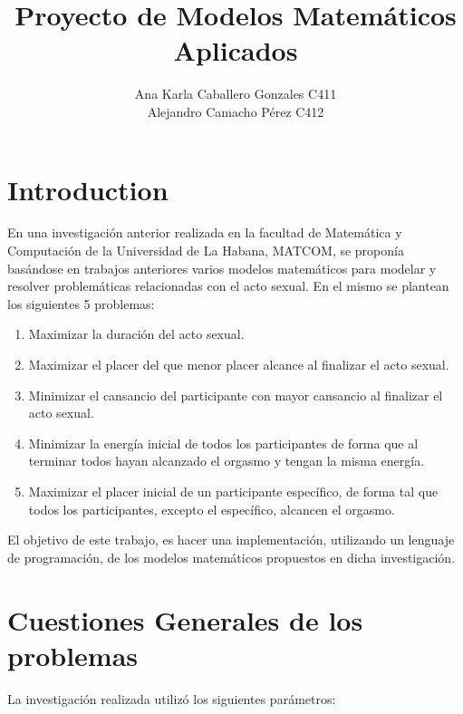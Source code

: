 \documentclass[12pt]{article}
\begin{document}
\title{Proyecto de Modelos Matemáticos Aplicados }
\author{Ana Karla Caballero Gonzales C411 \\ Alejandro Camacho Pérez C412}

\date{}

\maketitle



\section{Introduction}
En una investigación anterior realizada en la facultad de Matemática y Computación de la Universidad de La Habana, MATCOM, se proponía basándose en trabajos anteriores varios modelos matemáticos para modelar y resolver problemáticas relacionadas con el acto sexual. En el mismo se plantean los siguientes 5 problemas:

\begin{enumerate}
    \item Maximizar la duración del acto sexual.
    \item Maximizar el placer del que menor placer alcance al finalizar el acto sexual.
    \item Minimizar el cansancio del participante con mayor cansancio al finalizar el acto sexual.
    \item Minimizar la energía inicial de todos los participantes de forma que al terminar todos hayan alcanzado el orgasmo y tengan la misma energía.
    \item Maximizar el placer inicial de un participante específico, de forma tal que todos los participantes, excepto el específico, alcancen el orgasmo.
\end{enumerate}

El objetivo de este trabajo, es hacer una implementación, utilizando un lenguaje de programación, de los modelos matemáticos propuestos en dicha investigación.

\section{Cuestiones Generales de los problemas}

La investigación realizada utilizó los siguientes parámetros:
\end{document}
